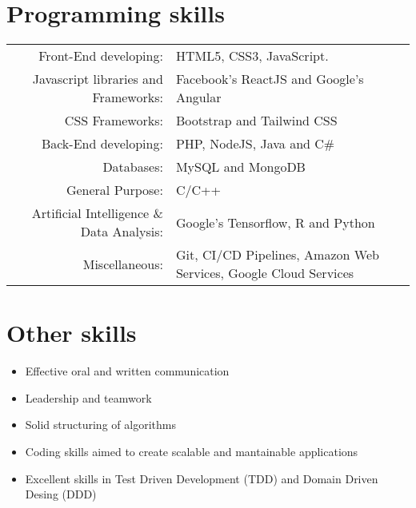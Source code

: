 \documentclass[a4paper,10.9pt]{article}
\begin{document}
\section{Programming skills}
\begin{tabular}{rl}
 Front-End developing:& HTML5, CSS3, JavaScript.\\
 Javascript libraries and Frameworks:& Facebook's ReactJS and Google's Angular\\
 CSS Frameworks:& Bootstrap and Tailwind CSS\\
 Back-End developing:& PHP, NodeJS, Java and C\#\\
 Databases:& MySQL and MongoDB\\
 General Purpose:& C/C++\\
 Artificial Intelligence \& Data Analysis:& Google's Tensorflow, R and Python\\
Miscellaneous:& Git, CI/CD Pipelines, Amazon Web Services, Google Cloud Services
\end{tabular}

\section{Other skills}

\begin{itemize}
	\item Effective oral and written communication
\item Leadership and teamwork
\item Solid structuring of algorithms
\item Coding skills aimed to create scalable and mantainable applications
\item Excellent skills in Test Driven Development (TDD) and Domain Driven Desing (DDD) 
\end{itemize}
\end{document}
